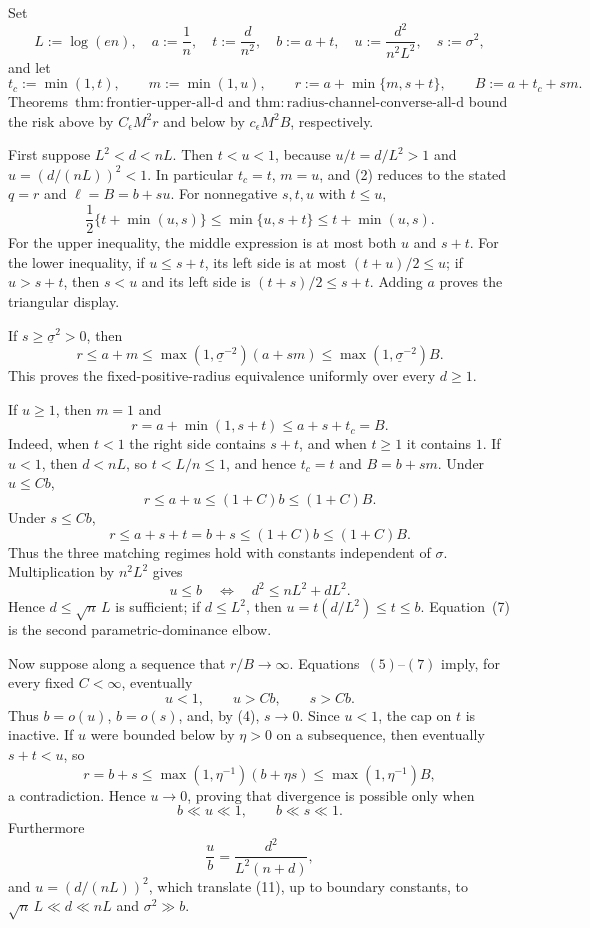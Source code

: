 Set
\[
 L:=\log(en),\quad a:=\frac1n,\quad t:=\frac d{n^2},
 \quad b:=a+t,\quad u:=\frac{d^2}{n^2L^2},\quad s:=\sigma^2,
\tag{1}
\]
and let
\[
 t_c:=\min(1,t),\qquad m:=\min(1,u),\qquad
 r:=a+\min\{m,s+t\},\qquad B:=a+t_c+sm.
\tag{2}
\]
Theorems~\(\mathrm{thm:frontier\text{-}upper\text{-}all\text{-}d}\) and \(\mathrm{thm:radius\text{-}channel\text{-}converse\text{-}all\text{-}d}\) bound the risk above by \(C_{\epsilon}M^2r\) and below by \(c_{\epsilon}M^2B\), respectively.

First suppose \(L^2<d<nL\).  Then \(t<u<1\), because \(u/t=d/L^2>1\) and \(u=(d/(nL))^2<1\).  In particular \(t_c=t\), \(m=u\), and (2) reduces to the stated \(q=r\) and \(\ell=B=b+su\).  For nonnegative \(s,t,u\) with \(t\le u\),
\[
 \frac12\{t+\min(u,s)\}
 \le\min\{u,s+t\}
 \le t+\min(u,s).
\tag{3}
\]
For the upper inequality, the middle expression is at most both \(u\) and \(s+t\).  For the lower inequality, if \(u\le s+t\), its left side is at most \((t+u)/2\le u\); if \(u>s+t\), then \(s<u\) and its left side is \((t+s)/2\le s+t\).  Adding \(a\) proves the triangular display.

If \(s\ge\underline\sigma^2>0\), then
\[
 r\le a+m
 \le\max(1,\underline\sigma^{-2})(a+sm)
 \le\max(1,\underline\sigma^{-2})B.
\tag{4}
\]
This proves the fixed-positive-radius equivalence uniformly over every \(d\ge1\).

If \(u\ge1\), then \(m=1\) and
\[
 r=a+\min(1,s+t)\le a+s+t_c=B.
\tag{5}
\]
Indeed, when \(t<1\) the right side contains \(s+t\), and when \(t\ge1\) it contains \(1\).  If \(u<1\), then \(d<nL\), so \(t<L/n\le1\), and hence \(t_c=t\) and \(B=b+sm\).  Under \(u\le Cb\),
\[
 r\le a+u\le(1+C)b\le(1+C)B.
\tag{6}
\]
Under \(s\le Cb\),
\[
 r\le a+s+t=b+s\le(1+C)b\le(1+C)B.
\tag{7}
\]
Thus the three matching regimes hold with constants independent of \(\sigma\).  Multiplication by \(n^2L^2\) gives
\[
 u\le b
 \quad\Longleftrightarrow\quad
 d^2\le nL^2+dL^2.
\tag{8}
\]
Hence \(d\le\sqrt n\,L\) is sufficient; if \(d\le L^2\), then \(u=t(d/L^2)\le t\le b\).  Equation~(7) is the second parametric-dominance elbow.

Now suppose along a sequence that \(r/B\to\infty\).  Equations~\((5)\)--\((7)\) imply, for every fixed \(C<\infty\), eventually
\[
 u<1,\qquad u>Cb,\qquad s>Cb.
\tag{9}
\]
Thus \(b=o(u)\), \(b=o(s)\), and, by (4), \(s\to0\).  Since \(u<1\), the cap on \(t\) is inactive.  If \(u\) were bounded below by \(\eta>0\) on a subsequence, then eventually \(s+t<u\), so
\[
 r=b+s\le\max(1,\eta^{-1})(b+\eta s)
 \le\max(1,\eta^{-1})B,
\tag{10}
\]
a contradiction.  Hence \(u\to0\), proving that divergence is possible only when
\[
 b\ll u\ll1,\qquad b\ll s\ll1.
\tag{11}
\]
Furthermore
\[
 \frac ub=\frac{d^2}{L^2(n+d)},
\tag{12}
\]
and \(u=(d/(nL))^2\), which translate (11), up to boundary constants, to \(\sqrt n\,L\ll d\ll nL\) and \(\sigma^2\gg b\).

